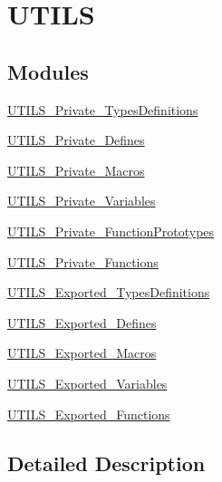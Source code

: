 \hypertarget{group___u_t_i_l_s}{}\section{U\+T\+I\+LS}
\label{group___u_t_i_l_s}
\subsection*{Modules}
\begin{DoxyCompactItemize}
\item 
\mbox{\hyperlink{group___u_t_i_l_s___private___types_definitions}{U\+T\+I\+L\+S\+\_\+\+Private\+\_\+\+Types\+Definitions}}
\item 
\mbox{\hyperlink{group___u_t_i_l_s___private___defines}{U\+T\+I\+L\+S\+\_\+\+Private\+\_\+\+Defines}}
\item 
\mbox{\hyperlink{group___u_t_i_l_s___private___macros}{U\+T\+I\+L\+S\+\_\+\+Private\+\_\+\+Macros}}
\item 
\mbox{\hyperlink{group___u_t_i_l_s___private___variables}{U\+T\+I\+L\+S\+\_\+\+Private\+\_\+\+Variables}}
\item 
\mbox{\hyperlink{group___u_t_i_l_s___private___function_prototypes}{U\+T\+I\+L\+S\+\_\+\+Private\+\_\+\+Function\+Prototypes}}
\item 
\mbox{\hyperlink{group___u_t_i_l_s___private___functions}{U\+T\+I\+L\+S\+\_\+\+Private\+\_\+\+Functions}}
\item 
\mbox{\hyperlink{group___u_t_i_l_s___exported___types_definitions}{U\+T\+I\+L\+S\+\_\+\+Exported\+\_\+\+Types\+Definitions}}
\item 
\mbox{\hyperlink{group___u_t_i_l_s___exported___defines}{U\+T\+I\+L\+S\+\_\+\+Exported\+\_\+\+Defines}}
\item 
\mbox{\hyperlink{group___u_t_i_l_s___exported___macros}{U\+T\+I\+L\+S\+\_\+\+Exported\+\_\+\+Macros}}
\item 
\mbox{\hyperlink{group___u_t_i_l_s___exported___variables}{U\+T\+I\+L\+S\+\_\+\+Exported\+\_\+\+Variables}}
\item 
\mbox{\hyperlink{group___u_t_i_l_s___exported___functions}{U\+T\+I\+L\+S\+\_\+\+Exported\+\_\+\+Functions}}
\end{DoxyCompactItemize}


\subsection{Detailed Description}
